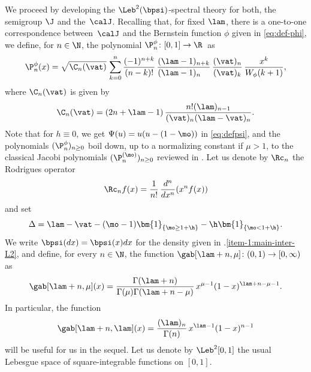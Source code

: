 We proceed by developing the $\Leb^2(\bpsi)$-spectral theory for both, the semigroup $\J$ and the~$\calJ$. Recalling that, for fixed $\lam$, there is a one-to-one correspondence between~$\calJ$ and the Bernstein function $\phi$ given in \eqref{eq:def-phi}, we define, for $n \in \N$, the polynomial \hbox{$\P_n^\phi \colon [0,1] \to \R$}~as
\begin{equation}
\label{eq:Jpolpsi}
\P_n^\phi (x)= \sqrt{\C_n(\vat)}\, \sum_{k=0}^n \frac{(-1)^{n+k}}{(n-k)!}\, \frac{(\lam-1)_{n+k}}{(\lam-1)_{n\phantom{+k}}}\, \frac{(\vat)_n}{(\vat)_k}\, \frac{x^k}{W_\phi(k+1)},
\end{equation}
where $\C_n(\vat)$ is given by\vspace*{-3pt}
\begin{equation*}
\C_n(\vat)=(2n+\lam-1)\,\frac{n!(\lam)_{n-1}}{(\vat)_n(\lam-\vat)_n}.
\end{equation*}
Note that for $h \equiv 0$, we get $\Psi(u) = u(u-(1-\mo))$ in \eqref{eq:defpsi}, and the polynomials $(\P_n^\phi)_{n \geq 0}$ boil down, up to a normalizing constant if $\mu>1$, to the classical Jacobi polynomials $(\P_n^{(\mo)})_{n \geq 0}$ reviewed in . Let us denote by $\Rc_n$ the Rodrigues operator\vspace*{-3pt}
\begin{equation}
\label{eq:def-Rodrigues}
\Rc_n f(x) = \frac{1}{n!}\, \frac{d^n}{dx^n}(x^n f(x))
\end{equation}
and set\vspace*{-3pt}
\begin{equation} \label{Delta}
\Delta = \lam-\vat - (\mo-1)\bm{1}_{\{\mo \geq 1+\h\}} - \h\bm{1}_{\{\mo < 1+\h\}}.
\end{equation}
We write $\bpsi(dx) = \bpsi(x)dx$ for the density given in .\eqref{item-1:main-inter-L2}, and define,
for every $n \in \N$, the function $\gab[\lam+n,\mu] \colon (0,1) \to [0,\infty)$ as
\begin{equation*}
\gab[\lam+n,\mu](x) = \frac{\Gamma(\lam+n)}{\Gamma(\mu)\Gamma(\lam+n-\mu)}\, x^{\mu-1}(1-x)^{\lam+n-\mu-1}.
\end{equation*}
In particular, the function\vspace*{-3pt}
\begin{equation*}
\gab[\lam+n,\lam](x) = \frac{(\lam)_n}{\Gamma(n)}\, x^{\lam-1}(1-x)^{n-1}
\end{equation*}
will be useful for us in the sequel. Let us denote by
$\Leb^2[0,1]$ the usual Lebesgue space of square-integrable functions on $[0,1]$.

